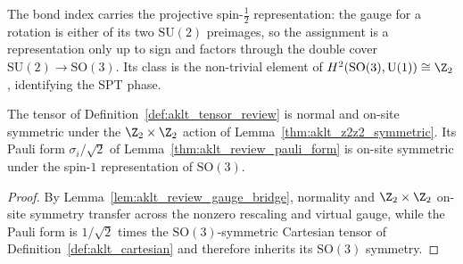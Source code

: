 \begin{remark}\label{rem:aklt_so3_spt}
    The bond index carries the projective spin-$\tfrac12$ representation: the
    gauge for a rotation is either of its two $\mathrm{SU}(2)$ preimages, so the
    assignment is a representation only up to sign and factors through the
    double cover $\mathrm{SU}(2) \to \mathrm{SO}(3)$. Its class is the
    non-trivial element of
    $H^2(\mathrm{SO}(3),\mathrm{U}(1)) \cong \Z_2$, identifying the SPT phase.
\end{remark}

\begin{lemma}%
    \label{thm:aklt_review_symmetries}
    \leanok
    The tensor of Definition~\ref{def:aklt_tensor_review} is normal and on-site
    symmetric under the $\Z_2\times\Z_2$ action of
    Lemma~\ref{thm:aklt_z2z2_symmetric}. Its Pauli form
    $\sigma_i/\sqrt2$ of Lemma~\ref{thm:aklt_review_pauli_form} is on-site
    symmetric under the spin-$1$ representation of $\mathrm{SO}(3)$.
\end{lemma}
\begin{proof}
    \leanok
    By Lemma~\ref{lem:aklt_review_gauge_bridge}, normality and
    $\Z_2\times\Z_2$ on-site symmetry transfer across the nonzero rescaling
    and virtual gauge, while the Pauli form is $1/\sqrt2$ times the
    $\mathrm{SO}(3)$-symmetric Cartesian tensor of
    Definition~\ref{def:aklt_cartesian} and therefore inherits its
    $\mathrm{SO}(3)$ symmetry.
\end{proof}

